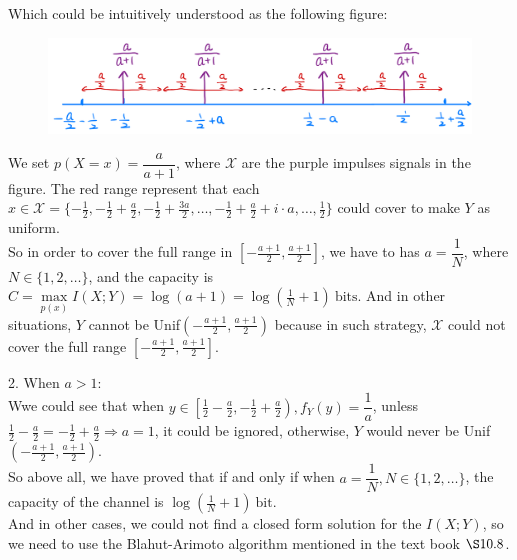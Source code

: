 Which could be intuitively understood as the following figure:
\begin{figure}[htbp]
    \centering
	\includegraphics[width=\textwidth]{../range.png}
\end{figure}
We set $p(X=x)=\dfrac{a}{a+1}$, where $\mathcal{X}$ are the purple impulses signals in the figure. The red range represent that each $x\in\mathcal{X}=\{-\frac{1}{2},-\frac{1}{2}+\frac{a}{2},-\frac{1}{2}+\frac{3a}{2},\ldots,-\frac{1}{2}+\frac{a}{2}+i\cdot a,\ldots, \frac{1}{2}\}$ could cover to make $Y$ as uniform. \\
So in order to cover the full range in $[-\frac{a+1}{2},\frac{a+1}{2}]$, we have to has $a=\dfrac{1}{N}$, where $N\in \{1,2,\ldots\}$, and the capacity is $C=\max  \limits_{p(x)}I(X;Y)=\log(a+1)=\log\left(\frac{1}{N}+1\right) \ \text{bits}$.
And in other situations, $Y$ cannot be Unif$(-\frac{a+1}{2},\frac{a+1}{2})$ because in such strategy, $\mathcal{X}$ could not cover the full range $\left[-\frac{a+1}{2},\frac{a+1}{2}\right]$.

2. When $a>1$: \\
Wwe could see that when $y\in\left[\frac{1}{2}-\frac{a}{2},-\frac{1}{2}+\frac{a}{2}\right), f_Y(y)=\dfrac{1}{a}$, unless $\frac{1}{2}-\frac{a}{2}=-\frac{1}{2}+\frac{a}{2}\Rightarrow a=1$, it could be ignored, otherwise, $Y$ would never be Unif$\left(-\frac{a+1}{2},\frac{a+1}{2}\right)$. \\

So above all, we have proved that if and only if when $a=\dfrac{1}{N}, N\in\{1,2,\ldots\}$, the capacity of the channel is $\log\left(\frac{1}{N}+1\right) \ \text{bit}$. \\
And in other cases, we could not find a closed form solution for the $I(X;Y)$, so we need to use the Blahut-Arimoto algorithm mentioned in the text book $\S 10.8$.

\newpage